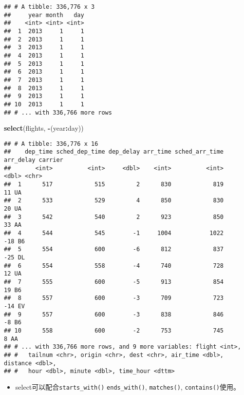 \documentclass[
]{article}
\newenvironment{Shaded}{\begin{snugshade}}{\end{snugshade}}
\newcommand{\KeywordTok}[1]{\textcolor[rgb]{0.13,0.29,0.53}{\textbf{#1}}}
\newcommand{\NormalTok}[1]{#1}
\newcommand{\OperatorTok}[1]{\textcolor[rgb]{0.81,0.36,0.00}{\textbf{#1}}}
\newcommand{\StringTok}[1]{\textcolor[rgb]{0.31,0.60,0.02}{#1}}
\providecommand{\tightlist}{%
  \setlength{\itemsep}{0pt}\setlength{\parskip}{0pt}}
\begin{document}
\begin{verbatim}
## # A tibble: 336,776 x 3
##     year month   day
##    <int> <int> <int>
##  1  2013     1     1
##  2  2013     1     1
##  3  2013     1     1
##  4  2013     1     1
##  5  2013     1     1
##  6  2013     1     1
##  7  2013     1     1
##  8  2013     1     1
##  9  2013     1     1
## 10  2013     1     1
## # ... with 336,766 more rows
\end{verbatim}

\begin{Shaded}
\begin{Highlighting}[]
\KeywordTok{select}\NormalTok{(flights, }\OperatorTok{-}\NormalTok{(year}\OperatorTok{:}\NormalTok{day))}
\end{Highlighting}
\end{Shaded}

\begin{verbatim}
## # A tibble: 336,776 x 16
##    dep_time sched_dep_time dep_delay arr_time sched_arr_time arr_delay carrier
##       <int>          <int>     <dbl>    <int>          <int>     <dbl> <chr>  
##  1      517            515         2      830            819        11 UA     
##  2      533            529         4      850            830        20 UA     
##  3      542            540         2      923            850        33 AA     
##  4      544            545        -1     1004           1022       -18 B6     
##  5      554            600        -6      812            837       -25 DL     
##  6      554            558        -4      740            728        12 UA     
##  7      555            600        -5      913            854        19 B6     
##  8      557            600        -3      709            723       -14 EV     
##  9      557            600        -3      838            846        -8 B6     
## 10      558            600        -2      753            745         8 AA     
## # ... with 336,766 more rows, and 9 more variables: flight <int>,
## #   tailnum <chr>, origin <chr>, dest <chr>, air_time <dbl>, distance <dbl>,
## #   hour <dbl>, minute <dbl>, time_hour <dttm>
\end{verbatim}

\begin{itemize}
\tightlist
\item
  select可以配合\texttt{starts\_with()} \texttt{ends\_with()},
  \texttt{matches()}, \texttt{contains()}使用。
\end{itemize}

\begin{Shaded}
\end{Shaded}
\end{document}
